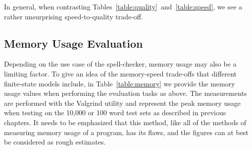 \documentclass[a4paper,12pt]{article}
\begin{document}
In general, when contrasting
Tables~\ref{table:quality}~and~\ref{table:speed}, we see a rather unsurprising
speed-to-quality trade-off.


%

\subsection{Memory Usage Evaluation}

Depending on the use case of the spell-checker, memory usage may also be a
limiting factor. To give an idea of the memory-speed trade-offs that
different finite-state models include, in Table~\ref{table:memory} we provide
the memory usage values when performing the evaluation tasks as above. The
measurements are performed with the Valgrind utility and represent the peak
memory usage when testing on the 10,000 or 100 word test sets as described in
previous chapters. It needs to be emphasized that this method, like all of
the methods of measuring memory usage of a program, has its flaws, and the
figures can at best be considered as rough estimates.
\end{document}
